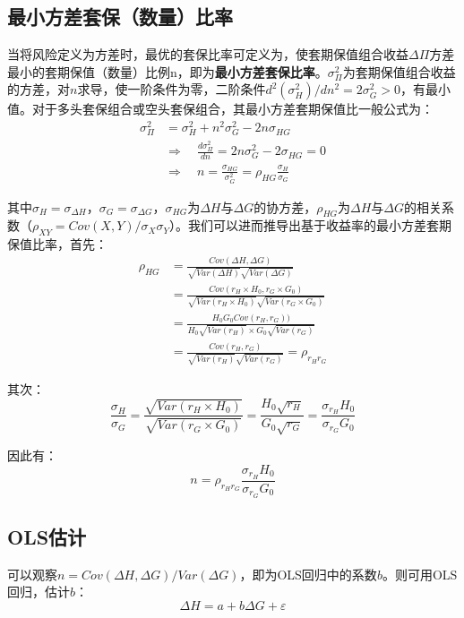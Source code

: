 \documentclass[11pt]{article}
\begin{document}
\subsection{最小方差套保（数量）比率}

当将风险定义为方差时，最优的套保比率可定义为，使套期保值组合收益$\Delta\Pi$方差最小的套期保值（数量）比例n，即为\textbf{最小方差套保比率}。$\sigma_\Pi^2$为套期保值组合收益的方差，对$n$求导，使一阶条件为零，二阶条件$d^2(\sigma_H^2)/dn^2=2\sigma_G^2>0$，有最小值。对于多头套保组合或空头套保组合，其最小方差套期保值比一般公式为：
\begin{align*}
    \sigma_{\Pi}^2 &= \sigma_H^2 + n^2\sigma_G^2 - 2n\sigma_{HG}\\
    &\Rightarrow \quad \frac{d\sigma_\Pi^2}{dn} = 2n\sigma_G^2 - 2\sigma_{HG} = 0 \\
    &\Rightarrow \quad n = \frac{\sigma_{HG}}{\sigma_G^2} =\rho_{HG} \frac{\sigma_H}{\sigma_G}
\end{align*}

其中$\sigma_H = \sigma_{\Delta H}$，$\sigma_G = \sigma_{\Delta G}$，$\sigma_{HG}$为$\Delta H$与$\Delta G$的协方差，$\rho_{HG}$为$\Delta H$与$\Delta G$的相关系数（$\rho_{XY} = Cov(X,Y)/\sigma_X\sigma_Y$）。我们可以进而推导出基于收益率的最小方差套期保值比率，首先：
\begin{align*}
    \rho_{HG} &= \frac{Cov(\Delta H,\Delta G)}{\sqrt{Var(\Delta H)} \sqrt{Var(\Delta G)}} \\
    &= \frac{Cov(r_H \times H_0,r_G \times G_0)}{\sqrt{Var(r_H \times H_0)} \sqrt{Var(r_G \times G_0)}}\\
    &= \frac{H_0 G_0 Cov(r_H,r_G))}{H_0 \sqrt{Var(r_H)} \times G_0 \sqrt{Var(r_G)}} \\
    &= \frac{Cov(r_H,r_G)}{\sqrt{Var(r_H)} \sqrt{Var(r_G)}} = \rho_{r_H r_G}
\end{align*}

其次：
\begin{equation*}
    \frac{\sigma_H}{\sigma_G} =  \frac{\sqrt{Var(r_H \times H_0)}}{\sqrt{Var(r_G \times G_0)}} = \frac{H_0 \sqrt{r_H}}{G_0 \sqrt{r_G}} = \frac{\sigma_{r_H} H_0}{\sigma_{r_G} G_0}
\end{equation*}

因此有：
\begin{equation*}
    n = \rho_{r_H r_G}\frac{\sigma_{r_H} H_0}{\sigma_{r_G} G_0}
\end{equation*}

\subsection{OLS估计}
可以观察$n = Cov(\Delta H,\Delta G)/Var(\Delta G)，$即为OLS回归中的系数$b$。则可用OLS回归，估计$b$：
\begin{equation*}
    \Delta H = a + b\Delta G + \varepsilon
\end{equation*}
\end{document}
